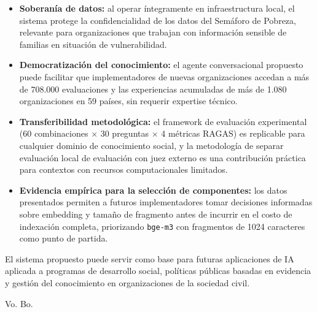 \documentclass{article}
\begin{document}
\begin{itemize}
\item \textbf{Soberanía de datos:} al operar íntegramente en infraestructura
  local, el sistema protege la confidencialidad de los datos del Semáforo de
  Pobreza, relevante para organizaciones que trabajan con información sensible
  de familias en situación de vulnerabilidad.

\item \textbf{Democratización del conocimiento:} el agente conversacional
  propuesto puede facilitar que implementadores de nuevas organizaciones accedan
  a más de 708.000 evaluaciones y las experiencias acumuladas de más de 1.080
  organizaciones en 59 países, sin requerir expertise técnico.

\item \textbf{Transferibilidad metodológica:} el framework de evaluación
  experimental (60 combinaciones $\times$ 30 preguntas $\times$ 4 métricas RAGAS)
  es replicable para cualquier dominio de conocimiento social, y la metodología
  de separar evaluación local de evaluación con juez externo es una contribución
  práctica para contextos con recursos computacionales limitados.

\item \textbf{Evidencia empírica para la selección de componentes:} los datos
  presentados permiten a futuros implementadores tomar decisiones informadas
  sobre embedding y tamaño de fragmento antes de incurrir en el costo de
  indexación completa, priorizando \texttt{bge-m3} con fragmentos de 1024
  caracteres como punto de partida.
\end{itemize}

El sistema propuesto puede servir como base para futuras aplicaciones de IA
aplicada a programas de desarrollo social, políticas públicas basadas en
evidencia y gestión del conocimiento en organizaciones de la sociedad civil.






\clearpage
\vfill
\Large{Vo. Bo.}
\\    \\    \\    \\    \\  \\    \\    \\    \\    \\   
 
\end{document}
